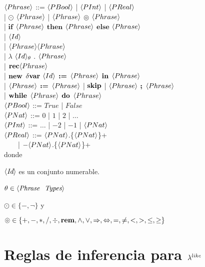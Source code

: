 \newpage

\noindent
$\langle Phrase \rangle$ ::= $\langle PBool \rangle$ | $\langle PInt \rangle$ | $\langle PReal \rangle$\\
\indent \indent \indent 
| $\odot$ $\langle Phrase \rangle$ | $\langle Phrase \rangle$ $\circledcirc$ $\langle Phrase \rangle$\\
\indent \indent \indent 
| $\textbf{if}$ $\langle Phrase \rangle$ $\textbf{then}$ $\langle Phrase \rangle$ $\textbf{else}$ $\langle Phrase \rangle$\\
\indent \indent \indent 
| $\langle Id \rangle$\\
\indent \indent \indent 
| $\langle Phrase \rangle\langle Phrase \rangle$\\
\indent \indent \indent 
| $\lambda$ $\langle Id \rangle_\theta$ . $\langle Phrase \rangle$\\
\indent \indent \indent 
| $\textbf{rec} \langle Phrase \rangle$\\
\indent \indent \indent 
| $\textbf{new}$ $\delta \textbf{var}$ $\langle Id \rangle$ $\textbf{:=}$ $\langle Phrase \rangle$ $\textbf{in}$ $\langle Phrase \rangle$\\
\indent \indent \indent 
| $\langle Phrase \rangle$ $\textbf{:=}$ $\langle Phrase \rangle$ | $\textbf{skip}$ | $\langle Phrase \rangle$ $\textbf{;}$ $\langle Phrase \rangle$\\
\indent \indent \indent
| $\textbf{while}$ $\langle Phrase \rangle$ $\textbf{do}$ $\langle Phrase \rangle$\\

\noindent
$\langle PBool \rangle$ ::= $True$ | $False$\\

\noindent
$\langle PNat \rangle$ ::= $0$ | $1$ | $2$ | $\ldots$\\

\noindent
$\langle PInt \rangle$ ::= $\ldots$ | $-2$ | $-1$ | $\langle PNat \rangle$\\

\noindent
$\langle PReal \rangle$ ::= $\langle PNat \rangle$.\{$\langle PNat \rangle$\}+\\
\indent \indent \ \ \ \
| $- \langle PNat \rangle$.\{$\langle PNat \rangle$\}+\\

\noindent
donde \ 

$\langle \textit{Id} \rangle$ es un conjunto numerable.

$\theta \in \langle \textit{Phrase \ Types} \rangle$ \

$\odot \in \{-, \neg\}$ y \

$\circledcirc \in \{+,-,*,/,\div,\textbf{rem},\wedge,\vee,\Rightarrow,\Leftrightarrow, =,\neq,<,>,\leq,\geq\}$

\section{Reglas de inferencia para $\lambda^{like}$}

